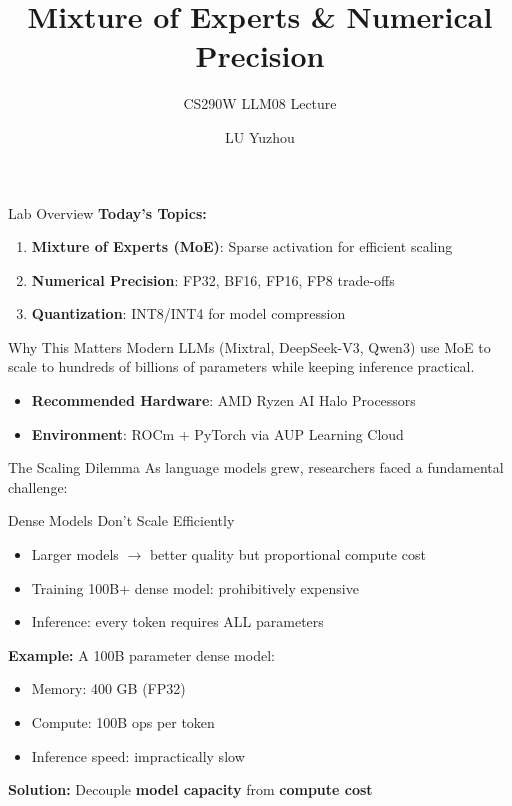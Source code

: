 \documentclass[aspectratio=169,10pt]{beamer}
\title{Mixture of Experts \& Numerical Precision}
\subtitle{CS290W LLM08 Lecture}
\author{LU Yuzhou}
\date{}
\begin{document}
\frame{\titlepage}

\begin{frame}{Lab Overview}
    \textbf{Today's Topics:}
    \begin{enumerate}
        \item \textbf{Mixture of Experts (MoE)}: Sparse activation for efficient scaling
        \item \textbf{Numerical Precision}: FP32, BF16, FP16, FP8 trade-offs
        \item \textbf{Quantization}: INT8/INT4 for model compression
    \end{enumerate}

    \vspace{0.5cm}
    \begin{block}{Why This Matters}
        Modern LLMs (Mixtral, DeepSeek-V3, Qwen3) use MoE to scale to hundreds of billions of parameters while keeping inference practical.
    \end{block}

    \vspace{0.3cm}
    \begin{itemize}
        \item \textbf{Recommended Hardware}: AMD Ryzen AI Halo Processors
        \item \textbf{Environment}: ROCm + PyTorch via AUP Learning Cloud
    \end{itemize}
\end{frame}

\begin{frame}{The Scaling Dilemma}
    As language models grew, researchers faced a fundamental challenge:

    \vspace{0.5cm}
    \begin{block}{Dense Models Don't Scale Efficiently}
        \begin{itemize}
            \item Larger models $\to$ better quality but proportional compute cost
            \item Training 100B+ dense model: prohibitively expensive
            \item Inference: every token requires ALL parameters
        \end{itemize}
    \end{block}

    \vspace{0.5cm}
    \textbf{Example:} A 100B parameter dense model:
    \begin{itemize}
        \item Memory: 400 GB (FP32)
        \item Compute: 100B ops per token
        \item Inference speed: impractically slow
    \end{itemize}

    \vspace{0.5cm}
    \textbf{Solution:} Decouple \textbf{model capacity} from \textbf{compute cost}
\end{frame}
\end{document}
